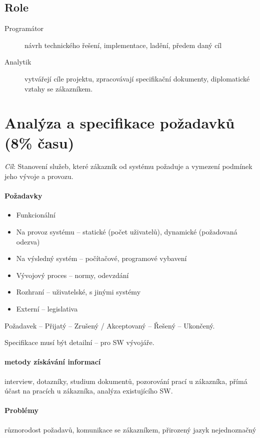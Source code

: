 \documentclass[a4paper, 11pt]{report}
\begin{document}
\subsection{Role}
\begin{description}
	\item[Programátor] návrh technického řešení, implementace, ladění, předem daný cíl
	\item[Analytik] vytvářejí cíle projektu, zpracovávají specifikační dokumenty, diplomatické vztahy se zákazníkem.
\end{description}

\section{Analýza a specifikace požadavků (8\% času)}

\emph{Cíl}: Stanovení služeb, které zákazník od systému požaduje a vymezení podmínek jeho vývoje a provozu.

\paragraph{Požadavky}
\begin{itemize}
	\item Funkcionální
	\item Na provoz systému -- statické (počet uživatelů), dynamické (požadovaná odezva)
	\item Na výsledný systém -- počítačové, programové vybavení
	\item Vývojový proces -- normy, odevzdání
	\item Rozhraní -- uživatelské, s jinými systémy
	\item Externí -- legislativa
\end{itemize}

Požadavek -- Přijatý -- Zrušený / Akceptovaný -- Řešený -- Ukončený.

Specifikace musí být detailní -- pro SW vývojáře.

\paragraph{metody získávání informací}
interview, dotazníky, studium dokumentů, pozorování prací u zákazníka, přímá účast na pracích u zákazníka, analýza existujícího SW.

\paragraph{Problémy} různorodost požadavů, komunikace se zákazníkem, přirozený jazyk nejednoznačný
\end{document}
